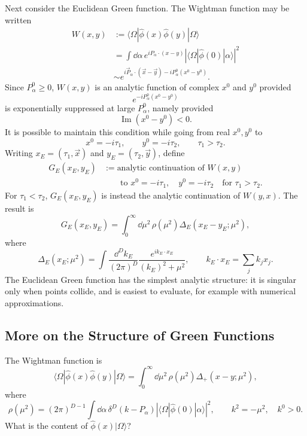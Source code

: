Next consider the Euclidean Green function. The Wightman function may be
written
\[
\begin{aligned}
  W(x,y)
  &:=
  \langle\Omega|\hat\phi(x)\hat\phi(y)|\Omega\rangle  \\
  &=
  \int \dd\alpha\,
  e^{iP_\alpha\cdot(x-y)}
  \left|\langle\Omega|\hat\phi(0)|\alpha\rangle\right|^2  \\
  &\sim
  e^{i\vec P_\alpha\cdot(\vec x-\vec y)
    -iP_\alpha^0(x^0-y^0)} .
\end{aligned}
\]
Since \(P_\alpha^0\ge 0\), \(W(x,y)\) is an analytic function of complex
\(x^0\) and \(y^0\) provided
\[
  e^{-iP_\alpha^0(x^0-y^0)}
\]
is exponentially suppressed at large \(P_\alpha^0\), namely provided
\[
  \operatorname{Im}(x^0-y^0)<0.
\]
It is possible to maintain this condition while going from real
\(x^0,y^0\) to
\[
  x^0=-i\tau_1,
  \qquad
  y^0=-i\tau_2,
  \qquad
  \tau_1>\tau_2.
\]
Writing \(x_E=(\tau_1,\vec x)\) and \(y_E=(\tau_2,\vec y)\), define
\[
\begin{aligned}
  G_E(x_E,y_E)
  &:=
  \text{analytic continuation of }W(x,y)  \\
  &\qquad
  \text{to }x^0=-i\tau_1,\quad y^0=-i\tau_2
  \quad\text{for }\tau_1>\tau_2 .
\end{aligned}
\]
For \(\tau_1<\tau_2\), \(G_E(x_E,y_E)\) is instead the analytic continuation
of \(W(y,x)\). The result is
\[
  G_E(x_E,y_E)
  =
  \int_0^\infty \dd\mu^2\,\rho(\mu^2)
  \Delta_E(x_E-y_E;\mu^2),
\]
where
\[
  \Delta_E(x_E;\mu^2)
  =
  \int \frac{\dd^D k_E}{(2\pi)^D}
  \frac{e^{ik_E\cdot x_E}}{(k_E)^2+\mu^2},
  \qquad
  k_E\cdot x_E=\sum_j k_jx_j.
\]
The Euclidean Green function has the simplest analytic structure: it is
singular only when points collide, and is easiest to evaluate, for example
with numerical approximations.

\subsection*{More on the Structure of Green Functions}

The Wightman function is
\[
  \langle\Omega|\hat\phi(x)\hat\phi(y)|\Omega\rangle
  =
  \int_0^\infty \dd\mu^2\,\rho(\mu^2)\Delta_+(x-y;\mu^2),
\]
where
\[
  \rho(\mu^2)
  =
  (2\pi)^{D-1}
  \int\dd\alpha\,\delta^D(k-P_\alpha)
  \left|\langle\Omega|\hat\phi(0)|\alpha\rangle\right|^2,
  \qquad
  k^2=-\mu^2,\quad k^0>0.
\]
What is the content of \(\hat\phi(x)|\Omega\rangle\)?

